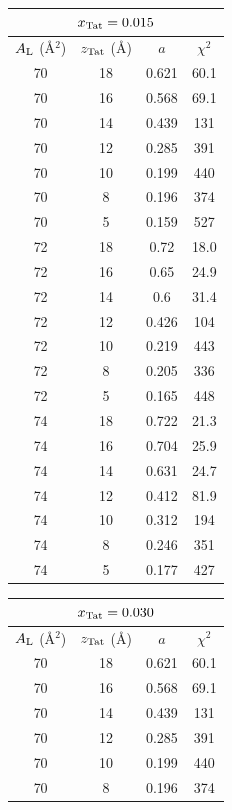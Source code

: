 \begin{table}[htbp]
  \centering
  \begin{tabular}{cccc}
    \multicolumn{4}{c}{$x_\textrm{Tat}=0.015$} \\
    \hline
    \rule{0pt}{14pt} %
    $A_\textrm{L}$ (\AA$^2$) & $z_\textrm{Tat}$ (\AA) & $a$ & $\chi^2$ \\
    \hline
    70 & 18 & 0.621 & 60.1 \\
    70 & 16 & 0.568 & 69.1 \\
    70 & 14 & 0.439 & 131 \\ 
    70 & 12 & 0.285 & 391 \\
    70 & 10 & 0.199 & 440 \\
    70 & 8  & 0.196 & 374 \\
    70 & 5  & 0.159	& 527 \\
    \hline
    72 & 18 & 0.72  & 18.0 \\
    72 & 16 & 0.65  & 24.9 \\
    72 & 14 & 0.6   & 31.4 \\
    72 & 12 & 0.426	& 104 \\
    72 & 10 & 0.219 & 443 \\
    72 & 8  & 0.205 & 336 \\
    72 & 5  & 0.165 & 448 \\
    \hline
    74 & 18 & 0.722 & 21.3 \\
    74 & 16 & 0.704	& 25.9 \\
    74 & 14 & 0.631 & 24.7 \\
    74 & 12 & 0.412 & 81.9 \\
    74 & 10 & 0.312 & 194 \\
    74 & 8  & 0.246 & 351 \\
    74 & 5  & 0.177 & 427 \\
    \hline
  \end{tabular}
  \qquad
  \begin{tabular}{c c c c}
    \multicolumn{4}{c}{$x_\textrm{Tat}=0.030$} \\
    \hline
    \rule{0pt}{14pt} %
    $A_\textrm{L}$ (\AA$^2$) & $z_\textrm{Tat}$ (\AA) & $a$ & $\chi^2$ \\
    \hline
    70 & 18 & 0.621 & 60.1 \\
    70 & 16 & 0.568 & 69.1 \\
    70 & 14 & 0.439 & 131 \\ 
    70 & 12 & 0.285 & 391 \\
    70 & 10 & 0.199 & 440 \\
    70 & 8  & 0.196 & 374 \\

\end{tabular}
\end{table}
